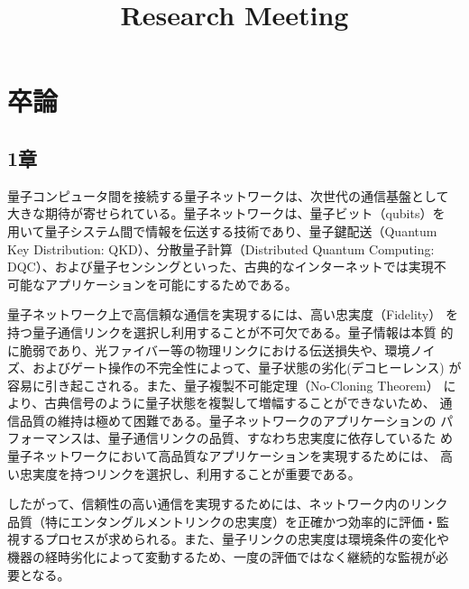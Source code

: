 \documentclass[conference]{IEEEtran}
\begin{document}
\title{Research Meeting}

\author{
}

\maketitle
\section*{卒論}
\label{sec:orga4c7f0e}



\subsection*{1章}
\label{sec:org3988d17}

量子コンピュータ間を接続する量子ネットワークは、次世代の通信基盤として
大きな期待が寄せられている。量子ネットワークは、量子ビット（qubits）を
用いて量子システム間で情報を伝送する技術であり、量子鍵配送（Quantum
Key Distribution: QKD）、分散量子計算（Distributed Quantum Computing:
DQC）、および量子センシングといった、古典的なインターネットでは実現不
可能なアプリケーションを可能にするためである。


量子ネットワーク上で高信頼な通信を実現するには、高い忠実度（Fidelity）
を持つ量子通信リンクを選択し利用することが不可欠である。量子情報は本質
的に脆弱であり、光ファイバー等の物理リンクにおける伝送損失や、環境ノイ
ズ、およびゲート操作の不完全性によって、量子状態の劣化(デコヒーレンス)
が容易に引き起こされる。また、量子複製不可能定理（No-Cloning Theorem）
により、古典信号のように量子状態を複製して増幅することができないため、
通信品質の維持は極めて困難である。量子ネットワークのアプリケーションの
パフォーマンスは、量子通信リンクの品質、すなわち忠実度に依存しているた
め量子ネットワークにおいて高品質なアプリケーションを実現するためには、
高い忠実度を持つリンクを選択し、利用することが重要である。


したがって、信頼性の高い通信を実現するためには、ネットワーク内のリンク
品質（特にエンタングルメントリンクの忠実度）を正確かつ効率的に評価・監
視するプロセスが求められる。また、量子リンクの忠実度は環境条件の変化や
機器の経時劣化によって変動するため、一度の評価ではなく継続的な監視が必
要となる。
\end{document}
